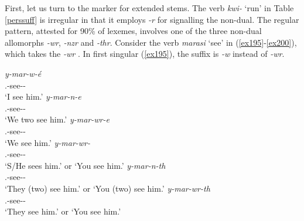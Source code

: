 First, let us turn to the  marker for extended stems. The verb \emph{kwi-} `run' in Table \ref{perssuff} is irregular in that it employs \emph{-r} for signalling the non-dual. The regular pattern, attested for 90\% of  lexemes, involves one of the three non-dual allomorphs \emph{-wr}, \emph{-nzr} and \emph{-thr}. Consider the verb \emph{marasi} `see' in (\ref{ex195}-\ref{ex200}), which takes the \emph{-wr} . In first  singular (\ref{ex195}), the  suffix is \emph{-w} instead of \emph{-wr}.

\begin{exe}
\ex \label{ex204}
\begin{xlist}
	\ex
	\gll \emph{y-mar-w-é}\\
	\Tsg.\Masc-see-\Ndu-\Fsg\\
	\trans `I see him.'
	\label{ex195}
	\ex
	\gll \emph{y-mar-n-e}\\
	\Tsg.\Masc-see-\Du-\Fnsg\\
	\trans `We two see him.'
	\label{ex196}
	\ex
	\gll \emph{y-mar-wr-e}\\
	\Tsg.\Masc-see-\Ndu-\Fnsg\\
	\trans `We see him.'
	\label{ex197}
	\ex
	\gll \emph{y-mar-wr-\Zero}\\
	\Tsg.\Masc-see-\Ndu-\Stsg\\
	\trans `S/He sees him.' or `You see him.'
	\label{ex198}
	\ex
	\gll \emph{y-mar-n-th}\\
	\Tsg.\Masc-see-\Du-\Stsg\\
	\trans `They (two) see him.' or `You (two) see him.'
	\label{ex199}
	\ex
	\gll \emph{y-mar-wr-th}\\
	\Tsg.\Masc-see-\Ndu-\Stnsg\\
	\trans `They see him.' or `You see him.'
	\label{ex200}
\end{xlist}
\end{exe}

